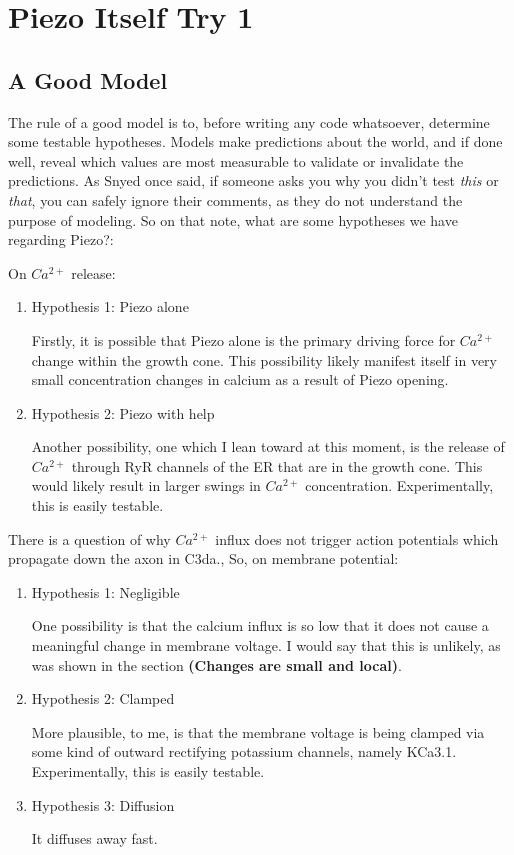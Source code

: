 \documentclass[12pt]{amsart}
\begin{document}
 \section{Piezo Itself Try 1}

 \subsection{A Good Model} The rule of a good model is to, before writing any code whatsoever, determine some testable hypotheses. Models make predictions about the world, and if done well, reveal which values are most measurable to validate or invalidate the predictions. As Snyed once said, if someone asks you why you didn't test \textit{this} or \textit{that}, you can safely ignore their comments, as they do not understand the purpose of modeling. So on that note, what are some hypotheses we have regarding Piezo?:\newline

On $Ca^{2+}$ release: 
\begin{enumerate}
    \item Hypothesis 1: Piezo alone

    Firstly, it is possible that Piezo alone is the primary driving force for $Ca^{2+}$ change within the growth cone. This possibility likely manifest itself in very small concentration changes in calcium as a result of Piezo opening. 
    
    \item Hypothesis 2: Piezo with help

    Another possibility, one which I lean toward at this moment, is the release of $Ca^{2+}$ through RyR channels of the ER that are in the growth cone. This would likely result in larger swings in $Ca^{2+}$ concentration. Experimentally, this is easily testable. 
\end{enumerate}

\bigskip

 There is a question of why $Ca^{2+}$ influx does not trigger action potentials which propagate down the axon in C3da., So, on membrane potential: 
\begin{enumerate}
    \item Hypothesis 1: Negligible

   One possibility is that the calcium influx is so low that it does not cause a meaningful change in membrane voltage. I would say that this is unlikely, as was shown in the section \textbf{(Changes are small and local)}. 
    
    \item Hypothesis 2: Clamped

    More plausible, to me, is that the membrane voltage is being clamped via some kind of outward rectifying potassium channels, namely KCa3.1. Experimentally, this is easily testable. 

    \item Hypothesis 3: Diffusion

    It diffuses away fast.
\end{enumerate}
\end{document}
